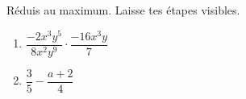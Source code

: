 %
%
    Réduis au maximum. Laisse tes étapes visibles.
    \begin{enumerate}[cols=2]
        \item $\dfrac{-2x^3y^5}{8x^2y^9} \cdot \dfrac{-16x^3y}{7}$
        \item $\dfrac{3}{5} - \dfrac{a+2}{4}$
    \end{enumerate}
